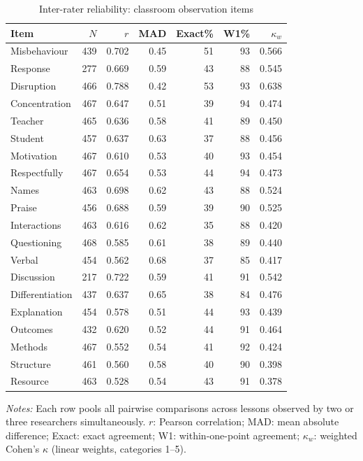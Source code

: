 \begin{table}[htbp]
\centering
\caption{Inter-rater reliability: classroom observation items}
\label{tab:irr_classroom}
\small
\begin{tabular}{lrrrrrr}
\toprule
Item & $N$ & $r$ & MAD & Exact\% & W1\% & $\kappa_w$ \\
\midrule
Misbehaviour & 439 & 0.702 & 0.45 & 51 & 93 & 0.566 \\
Response & 277 & 0.669 & 0.59 & 43 & 88 & 0.545 \\
Disruption & 466 & 0.788 & 0.42 & 53 & 93 & 0.638 \\
Concentration & 467 & 0.647 & 0.51 & 39 & 94 & 0.474 \\
Teacher & 465 & 0.636 & 0.58 & 41 & 89 & 0.450 \\
Student & 457 & 0.637 & 0.63 & 37 & 88 & 0.456 \\
Motivation & 467 & 0.610 & 0.53 & 40 & 93 & 0.454 \\
Respectfully & 467 & 0.654 & 0.53 & 44 & 94 & 0.473 \\
Names & 463 & 0.698 & 0.62 & 43 & 88 & 0.524 \\
Praise & 456 & 0.688 & 0.59 & 39 & 90 & 0.525 \\
Interactions & 463 & 0.616 & 0.62 & 35 & 88 & 0.420 \\
Questioning & 468 & 0.585 & 0.61 & 38 & 89 & 0.440 \\
Verbal & 454 & 0.562 & 0.68 & 37 & 85 & 0.417 \\
Discussion & 217 & 0.722 & 0.59 & 41 & 91 & 0.542 \\
Differentiation & 437 & 0.637 & 0.65 & 38 & 84 & 0.476 \\
Explanation & 454 & 0.578 & 0.51 & 44 & 93 & 0.439 \\
Outcomes & 432 & 0.620 & 0.52 & 44 & 91 & 0.464 \\
Methods & 467 & 0.552 & 0.54 & 41 & 92 & 0.424 \\
Structure & 461 & 0.560 & 0.58 & 40 & 90 & 0.398 \\
Resource & 463 & 0.528 & 0.54 & 43 & 91 & 0.378 \\
\bottomrule
\end{tabular}
\begin{minipage}{\linewidth}
\smallskip
\footnotesize\textit{Notes:} Each row pools all pairwise comparisons across lessons observed by two or three researchers simultaneously. $r$: Pearson correlation; MAD: mean absolute difference; Exact: exact agreement; W1: within-one-point agreement; $\kappa_w$: weighted Cohen's $\kappa$ (linear weights, categories 1--5).
\end{minipage}
\end{table}
